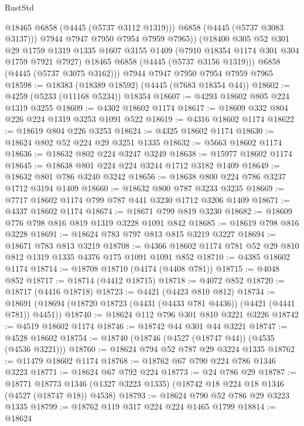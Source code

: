\begin{lexlean}{RustStd}
\begin{coremodule}
              @18465
              @6858
              (@4445 (@5737 @3112 @1319)))
            @6858
            (@4445 (@5737 @3083 @3137)))
          @7944
          @7947
          @7950
          @7954
          @7959
          @7965))
      (@18400
        @305
        @52
        @301
        @29
        @1759
        @1319
        @1335
        @1607
        @3155
        @1409
        (@7910 @18354 @1174 @301 @304 @1759 @7921 @7927)
        @18465
        @6858
        (@4445 (@5737 @3156 @1319)))
      @6858
      (@4445 (@5737 @3075 @3162)))
    @7944
    @7947
    @7950
    @7954
    @7959
    @7965
@18598 := @18383 (@18389 @18592) (@4445 (@7683 @18354 @44))
@18602 := @4259 (@5233 (@11168 @5234)) @18354
@18607 := @4293 @18602 @805 @224 @1319 @3255
@18609 := @4302 @18602 @1174
@18617 := @18609 @332 @804 @226 @224 @1319 @3253 @1091 @522
@18619 := @4316 @18602 @1174
@18622 := @18619 @804 @226 @3253
@18624 := @4325 @18602 @1174
@18630 := @18624 @802 @52 @224 @29 @3251 @1335
@18632 := @5663 @18602 @1174
@18636 := @18632 @802 @224 @3247 @3249
@18638 := @15977 @18602 @1174
@18645 := @18638 @801 @224 @224 @3244 @1712 @3182 @1409
@18649 := @18632 @801 @786 @3240 @3242
@18656 := @18638 @800 @224 @786 @3237 @1712 @3194 @1409
@18660 := @18632 @800 @787 @3233 @3235
@18669 := @7717 @18602 @1174 @799 @787 @441 @3230 @1712 @3206 @1409
@18671 := @4337 @18602 @1174
@18674 := @18671 @799 @819 @3230
@18682 := @18609 @776 @798 @816 @819 @1319 @3228 @1091 @842
@18685 := @18619 @798 @816 @3228
@18691 := @18624 @783 @797 @813 @815 @3219 @3227
@18694 := @18671 @783 @813 @3219
@18708 := @4366 @18602 @1174 @781 @52 @29 @810 @812 @1319 @1335 @4376 @175 @1091 @1091 @852
@18710 := @4385 @18602 @1174
@18714 := @18708 @18710 (@4174 (@4408 @781))
@18715 := @4048 @852
@18717 := @18714 (@4412 @18715)
@18718 := @4072 @852
@18720 := @18717 (@4416 @18718)
@18723 := @4421 (@4423 @810 @812)
@18734 := @18691 (@18694 (@18720 @18723 (@4431 (@4433 @781 @4436)) (@4421 (@4441 @781)) @4451))
@18740 := @18624 @112 @796 @301 @810 @3221 @3226
@18742 := @4519 @18602 @1174
@18746 := @18742 @44 @301 @44 @3221
@18747 := @4528 @18602
@18754 := @18740 (@18746 (@4527 (@18747 @44)) (@4535 (@4536 @3221)))
@18760 := @18624 @794 @52 @787 @29 @3224 @1335
@18762 := @11479 @18602 @1174
@18768 := @18762 @67 @790 @224 @786 @1346 @3223
@18771 := @18624 @67 @792 @224
@18773 := @24 @786 @29
@18787 := @18771
    @18773
    @1346
    (@1327 @3223 @1335)
    (@18742 @18 @224 @18 @1346 (@4527 (@18747 @18)) @4538)
@18793 := @18624 @790 @52 @786 @29 @3223 @1335
@18799 := @18762 @119 @317 @224 @224 @1465 @1799
@18814 := @18624

\end{coremodule}
\end{lexlean}

